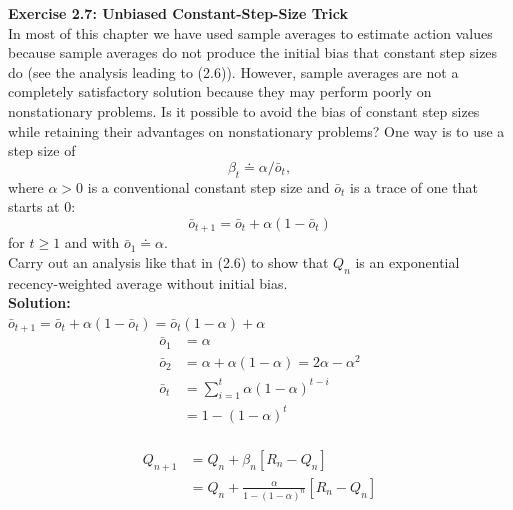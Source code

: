 \textbf{Exercise 2.7: Unbiased Constant-Step-Size Trick} \\
In most of this chapter we have used
sample averages to estimate action values because sample averages do not produce the
initial bias that constant step sizes do (see the analysis leading to (2.6)). However, sample
averages are not a completely satisfactory solution because they may perform poorly
on nonstationary problems. Is it possible to avoid the bias of constant step sizes while
retaining their advantages on nonstationary problems? One way is to use a step size of
\begin{equation}
    \beta_t \doteq \alpha / \bar{o}_t,
\end{equation}
where $\alpha > 0$ is a conventional constant step size and $\bar{o}_t$ is a trace of one that starts at 0:
\begin{equation}
    \bar{o}_{t+1} = \bar{o}_t + \alpha (1 - \bar{o}_t)
\end{equation}
for $t \geq 1$ and with $\bar{o}_1 \doteq \alpha$. \\

Carry out an analysis like that in (2.6) to show that $Q_n$ is an exponential recency-weighted average without initial bias.\\

\textbf{Solution:}\\

$\bar{o}_{t+1} = \bar{o}_t + \alpha (1 - \bar{o}_t) = \bar{o}_t(1-\alpha) + \alpha $\\

\begin{equation}
    \begin{aligned}
        \bar{o}_{1} &= \alpha \\
        \bar{o}_{2} &= \alpha + \alpha(1- \alpha) = 2\alpha - \alpha^2 \\
        \bar{o}_{t} &= \sum_{i=1}^{t} \alpha (1-\alpha)^{t-i}\\
        &=1-\left(1-\alpha\right)^{t}\\
    \end{aligned}
\end{equation}

\begin{equation}
    \begin{aligned}
        Q_{n+1} &= Q_n + \beta_n \left[ R_n - Q_n \right] \\
        &= Q_n + \frac{\alpha}{1-\left(1-\alpha\right)^{n}} \left[ R_n - Q_n \right] \\
    \end{aligned}
\end{equation}

